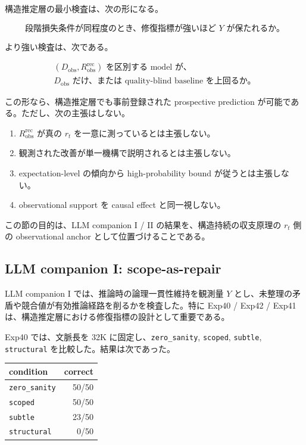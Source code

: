\documentclass[12pt,a4paper]{article}
\begin{document}
構造推定層の最小検査は、次の形になる。

\[
\text{段階損失条件が同程度のとき、修復指標が強いほど }Y\text{ が保たれるか。}
\]

より強い検査は、次である。

\[
\begin{aligned}
(D_{\mathrm{obs}},R_{\mathrm{obs}}^{\mathrm{rec}})\text{ を区別する model が、} \\
D_{\mathrm{obs}}\text{ だけ、または quality-blind baseline を上回るか。}
\end{aligned}
\]

この形なら、構造推定層でも事前登録された prospective prediction が可能である。ただし、次の主張はしない。

\begin{enumerate}
\def\labelenumi{\arabic{enumi}.}
\tightlist
\item
  \(R_{\mathrm{obs}}^{\mathrm{rec}}\) が真の \(r_{t}\) を一意に測っているとは主張しない。
\item
  観測された改善が単一機構で説明されるとは主張しない。
\item
  expectation-level の傾向から high-probability bound が従うとは主張しない。
\item
  observational support を causal effect と同一視しない。
\end{enumerate}

この節の目的は、LLM companion I / II の結果を、構造持続の収支原理の \(r_{t}\) 側の observational anchor として位置づけることである。

\subsection{LLM companion I: scope-as-repair}\label{llm-companion-i-scope-as-repair}

LLM companion I では、推論時の論理一貫性維持を観測量 \(Y\) とし、未整理の矛盾や競合値が有効推論経路を削るかを検査した。特に Exp40 / Exp42 / Exp41 は、構造推定層における修復指標の設計として重要である。

Exp40 では、文脈長を 32K に固定し、\texttt{zero\_sanity}, \texttt{scoped}, \texttt{subtle}, \texttt{structural} を比較した。結果は次であった。

{\def\LTcaptype{table} %
\begin{longtable}[]{@{}lr@{}}
\toprule\noalign{}
condition & correct \\
\midrule\noalign{}
\endhead
\bottomrule\noalign{}
\endlastfoot
\texttt{zero\_sanity} & 50/50 \\
\texttt{scoped} & 50/50 \\
\texttt{subtle} & 23/50 \\
\texttt{structural} & 0/50 \\
\end{longtable}
}
\end{document}
